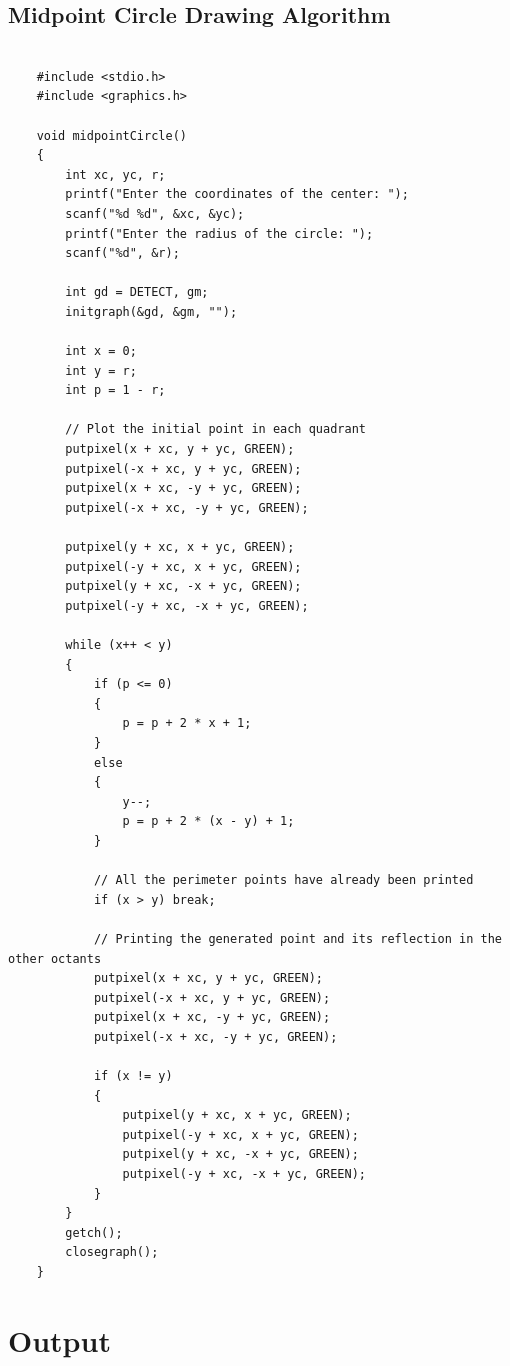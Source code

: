 \documentclass[12pt]{article}
\begin{document}
	\subsection{Midpoint Circle Drawing Algorithm}
	\begin{verbatim}
	
	#include <stdio.h>
	#include <graphics.h>
	
	void midpointCircle()
	{
	    int xc, yc, r;
	    printf("Enter the coordinates of the center: ");
	    scanf("%d %d", &xc, &yc);
	    printf("Enter the radius of the circle: ");
	    scanf("%d", &r);
	
	    int gd = DETECT, gm;
	    initgraph(&gd, &gm, "");
	
	    int x = 0;
	    int y = r;
	    int p = 1 - r;
	
	    // Plot the initial point in each quadrant
	    putpixel(x + xc, y + yc, GREEN);
	    putpixel(-x + xc, y + yc, GREEN);
	    putpixel(x + xc, -y + yc, GREEN);
	    putpixel(-x + xc, -y + yc, GREEN);
	
	    putpixel(y + xc, x + yc, GREEN);
	    putpixel(-y + xc, x + yc, GREEN);
	    putpixel(y + xc, -x + yc, GREEN);
	    putpixel(-y + xc, -x + yc, GREEN);
	
	    while (x++ < y)
	    {
	        if (p <= 0)
	        {
	            p = p + 2 * x + 1;
	        }
	        else
	        {
	            y--;
	            p = p + 2 * (x - y) + 1;
	        }
	
	        // All the perimeter points have already been printed
	        if (x > y) break;
	
	        // Printing the generated point and its reflection in the other octants
	        putpixel(x + xc, y + yc, GREEN);
	        putpixel(-x + xc, y + yc, GREEN);
	        putpixel(x + xc, -y + yc, GREEN);
	        putpixel(-x + xc, -y + yc, GREEN);
	
	        if (x != y)
	        {
	            putpixel(y + xc, x + yc, GREEN);
	            putpixel(-y + xc, x + yc, GREEN);
	            putpixel(y + xc, -x + yc, GREEN);
	            putpixel(-y + xc, -x + yc, GREEN);
	        }
	    }
	    getch();
	    closegraph();
	}
	\end{verbatim}
	
	\section{Output}
\end{document}
